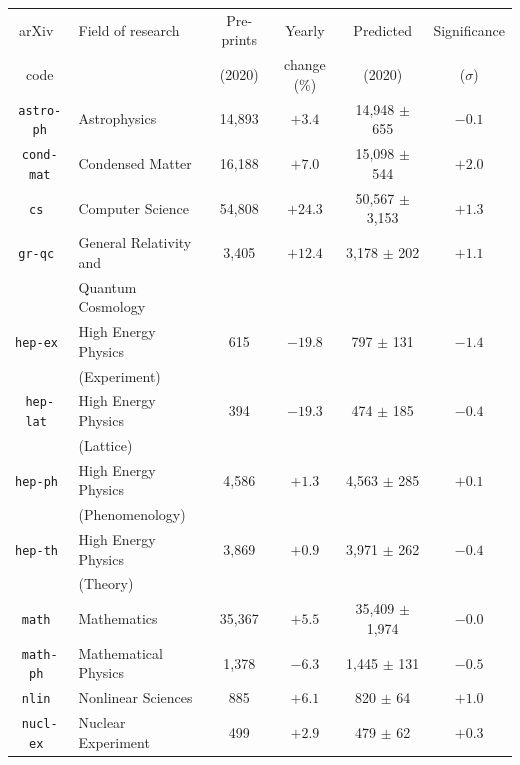 \documentclass[a4paper,12pt]{article}
\newcommand{\arxiv}{arXiv}
\begin{document}
\begin{table}
\begin{center}
\small
    \label{tab:table1}
    \begin{tabular}{|c|l|c|c|c|c|} 
    \hline
    	\arxiv\ & Field of research & Pre-prints & Yearly & Predicted & Significance \\
	code &&(2020)& change (\%)&(2020)&($\sigma$)\\
      \hline
\texttt{astro-ph}    & Astrophysics           & 14,893    & $ +3.4$ & 14,948 $\pm$ 655    & $-0.1$ \\
\texttt{cond-mat}    & Condensed Matter       & 16,188    & $ +7.0$ & 15,098 $\pm$ 544    & $+2.0$ \\
\texttt{cs      }    & Computer Science       & 54,808    & $+24.3$ & 50,567 $\pm$ 3,153  & $+1.3$ \\
\texttt{gr-qc   }    & General Relativity and & 3,405     & $+12.4$ & 3,178 $\pm$ 202     & $+1.1$ \\
					 & Quantum Cosmology      &&&&\\
\texttt{hep-ex  }    & High Energy Physics    & 615       & $-19.8$ & 797 $\pm$ 131       & $-1.4$ \\
                     & (Experiment)           &&&&\\
\texttt{hep-lat }    & High Energy Physics    & 394       & $-19.3$ & 474 $\pm$ 185       & $-0.4$ \\
                     & (Lattice)              &&&&\\
\texttt{hep-ph  }    & High Energy Physics    & 4,586     & $ +1.3$ & 4,563 $\pm$ 285     & $+0.1$ \\
                     & (Phenomenology)        &&&&\\
\texttt{hep-th  }    & High Energy Physics    & 3,869     & $ +0.9$ & 3,971 $\pm$ 262     & $-0.4$ \\
                     & (Theory)               &&&&\\
\texttt{math    }    & Mathematics            & 35,367    & $ +5.5$ & 35,409 $\pm$ 1,974  & $-0.0$ \\
\texttt{math-ph }    & Mathematical Physics   & 1,378     & $ -6.3$ & 1,445 $\pm$ 131     & $-0.5$ \\
\texttt{nlin    }    & Nonlinear Sciences     & 885       & $ +6.1$ & 820 $\pm$ 64        & $+1.0$ \\
\texttt{nucl-ex }    & Nuclear Experiment     & 499       & $ +2.9$ & 479 $\pm$ 62        & $+0.3$ \\

\end{tabular}
\end{center}
\end{table}
\end{document}
